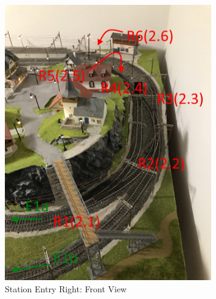 \documentclass{scrreprt}
\begin{document}
\begin{appendices}
\begin{figure}[h!]
	\includegraphics[width=0.8\textwidth]{ref/right front}
	\caption{Station Entry Right: Front View}
\end{figure}



\end{appendices}
\end{document}

